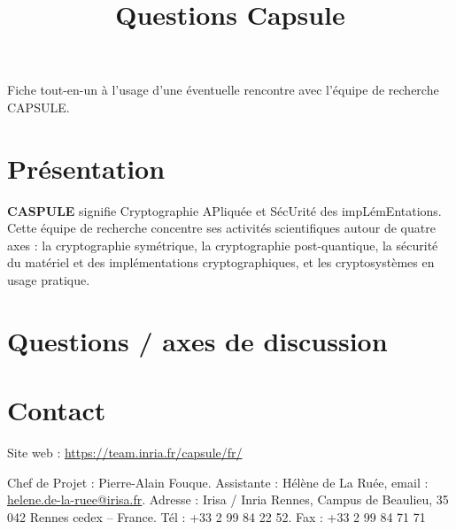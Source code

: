 \documentclass{article}
\title{Questions Capsule}
\author{}
\date{}
\begin{document}
\maketitle

Fiche tout-en-un à l'usage d'une éventuelle rencontre avec l'équipe de recherche CAPSULE.

\section{Présentation}

\textbf{CASPULE} signifie Cryptographie APliquée et SécUrité des impLémEntations.
Cette équipe de recherche concentre ses activités scientifiques autour de quatre axes : la cryptographie symétrique, la cryptographie post-quantique, la sécurité du matériel et des implémentations cryptographiques, et les cryptosystèmes en usage pratique.

\section{Questions / axes de discussion}


\section{Contact}

Site web : \url{https://team.inria.fr/capsule/fr/}

Chef de Projet : Pierre-Alain Fouque. Assistante : Hélène de La Ruée, email : \href{mailto:helene.de-la-ruee@irisa.fr}{helene.de-la-ruee@irisa.fr}. Adresse : Irisa / Inria Rennes, Campus de Beaulieu, 35 042 Rennes cedex – France. Tél : +33 2 99 84 22 52. Fax : +33 2 99 84 71 71
\end{document}
